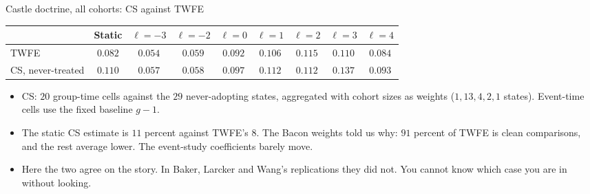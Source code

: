 \documentclass[
  11pt,
  ignorenonframetext,
  aspectratio=169,
]{beamer}
\providecommand{\tightlist}{%
  \setlength{\itemsep}{0pt}\setlength{\parskip}{0pt}}
\begin{document}
\begin{frame}{Castle doctrine, all cohorts: CS against TWFE}
\protect{}\label{castle-doctrine-all-cohorts-cs-against-twfe}
\begin{center}\small
\begin{tabular}{lcccccccc}
\toprule
 & Static & $\ell=-3$ & $\ell=-2$ & $\ell=0$ & $\ell=1$ & $\ell=2$ & $\ell=3$ & $\ell=4$ \\
\midrule
TWFE & $0.082$ & $0.054$ & $0.059$ & $0.092$ & $0.106$ & $0.115$ & $0.110$ & $0.084$ \\
CS, never-treated & $0.110$ & $0.057$ & $0.058$ & $0.097$ & $0.112$ & $0.112$ & $0.137$ & $0.093$ \\
\bottomrule
\end{tabular}
\end{center}

\begin{itemize}
\tightlist
\item
  CS: \(20\) group-time cells against the \(29\) never-adopting states,
  aggregated with cohort sizes as weights (\(1, 13, 4, 2, 1\) states).
  Event-time cells use the fixed baseline \(g-1\).
\item
  The static CS estimate is \(11\) percent against TWFE's \(8\). The
  Bacon weights told us why: \(91\) percent of TWFE is clean
  comparisons, and the rest average lower. The event-study coefficients
  barely move.
\item
  Here the two agree on the story. In Baker, Larcker and Wang's
  replications they did not. You cannot know which case you are in
  without looking.
\end{itemize}
\end{frame}
\end{document}
